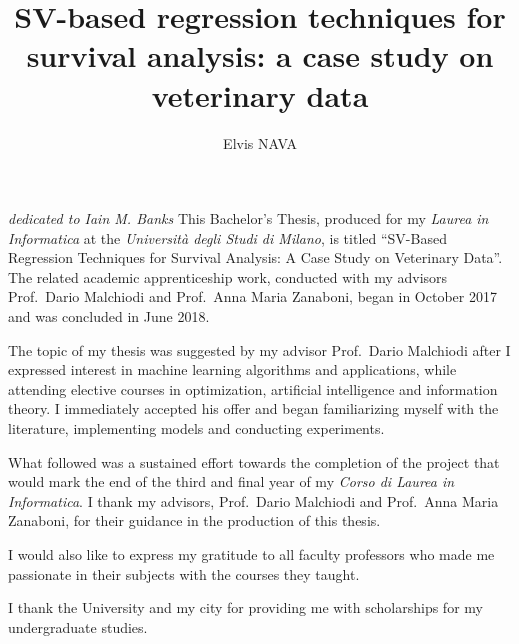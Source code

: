 \documentclass[12pt]{report}
\begin{document}
\title{SV-based regression techniques for survival analysis: a case study on veterinary data}
\author{Elvis NAVA}
%
% 
%
\beforepreface
{}
\vspace*{\fill}
{\hfill \Large {\sl dedicated to Iain M. Banks}}
\vspace*{\fill}
% 
%
This Bachelor's Thesis, produced for my \textit{Laurea in Informatica} at the \textit{Università degli Studi di Milano}, is titled ``SV-Based Regression Techniques for Survival Analysis: A Case Study on Veterinary Data''. The related academic apprenticeship work, conducted with my advisors Prof.\ Dario Malchiodi and Prof.\ Anna Maria Zanaboni, began in October 2017 and was concluded in June 2018.

The topic of my thesis was suggested by my advisor Prof.\ Dario Malchiodi after I expressed interest in machine learning algorithms and applications, while attending elective courses in optimization, artificial intelligence and information theory. I immediately accepted his offer and began familiarizing myself with the literature, implementing models and conducting experiments.

What followed was a sustained effort towards the completion of the project that would mark the end of the third and final year of my \textit{Corso di Laurea in Informatica}.
%
%
I thank my advisors, Prof.\ Dario Malchiodi and Prof.\ Anna Maria Zanaboni, for their guidance in the production of this thesis.

I would also like to express my gratitude to all faculty professors who made me passionate in their subjects with the courses they taught.

I thank the University and my city for providing me with scholarships for my undergraduate studies.
\end{document}
